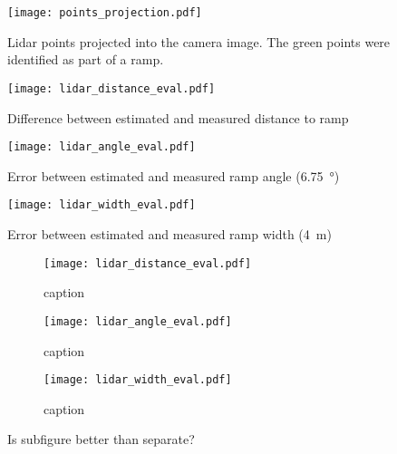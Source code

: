 \begin{figure}[htbp]
	\centering
	\texttt{[image: points\_projection.pdf]}
	\caption{Lidar points projected into the camera image. The green points were identified as part of a ramp.}
\end{figure}
\newpage
\begin{figure}[htbp]
	\centering
	\texttt{[image: lidar\_distance\_eval.pdf]}
	\caption{Difference between estimated and measured distance to ramp}
	\label{fig:lidar_distance_eval}
\end{figure}
\begin{figure}[htbp]
	\centering
	\texttt{[image: lidar\_angle\_eval.pdf]}
	\caption{Error between estimated and measured ramp angle (\SI{6.75}{\degree})}
	\label{fig:lidar_angle_eval}
\end{figure}
\begin{figure}[htbp]
	\centering
	\texttt{[image: lidar\_width\_eval.pdf]}
	\caption{Error between estimated and measured ramp width (\SI{4}{\metre})}
	\label{fig:lidar_width_eval}
\end{figure}

\begin{figure}[htb]
	\centering
	\begin{subfigure}{1\textwidth}
		\centering
		\texttt{[image: lidar\_distance\_eval.pdf]}
		\caption{caption}
		\label{fig:lidar_distance_evalTest}
	\end{subfigure}
	
	\begin{subfigure}{1\textwidth}
		\centering
		\texttt{[image: lidar\_angle\_eval.pdf]}
		\caption{caption}
		\label{fig:lidar_angle_evalTest}
	\end{subfigure}
	
	\begin{subfigure}{1\textwidth}
		\centering
		\texttt{[image: lidar\_width\_eval.pdf]}
		\caption{caption}
		\label{fig:lidar_width_evalTest}
	\end{subfigure}
	\caption{Is subfigure better than separate?}
	\label{fig:subFigTest}
\end{figure}